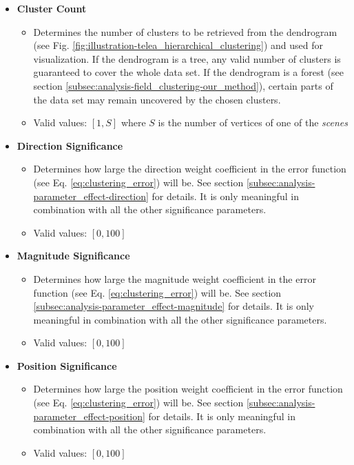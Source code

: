 \begin{itemize}
\item {\bf Cluster Count}
	\begin{itemize}
		\item Determines the number of clusters to be retrieved from the dendrogram (see Fig. \ref{fig:illustration-telea_hierarchical_clustering}) and used for visualization. If the dendrogram is a tree, any valid number of clusters is guaranteed to cover the whole data set. If the dendrogram is a forest (see section \ref{subsec:analysis-field_clustering-our_method}), certain parts of the data set may remain uncovered by the chosen clusters.
		\item Valid values: \([1,S]\) where \(S\) is the number of vertices of one of the {\it scenes}
	\end{itemize}

\item {\bf Direction Significance} 
	\begin{itemize}
		\item Determines how large the direction weight coefficient in the error function (see Eq. \ref{eq:clustering_error}) will be. See section \ref{subsec:analysis-parameter_effect-direction} for details. It is only meaningful in combination with all the other significance parameters\footnotemark.
		\item Valid values: \([0,100]\)
	\end{itemize}

\item {\bf Magnitude Significance}
	\begin{itemize}
		\item Determines how large the magnitude weight coefficient in the error function (see Eq. \ref{eq:clustering_error}) will be. See section \ref{subsec:analysis-parameter_effect-magnitude} for details. It is only meaningful in combination with all the other significance parameters\footnotemark.
		\item Valid values: \([0,100]\)
	\end{itemize}

\item {\bf Position Significance} 
	\begin{itemize}
		\item Determines how large the position weight coefficient in the error function (see Eq. \ref{eq:clustering_error}) will be. See section \ref{subsec:analysis-parameter_effect-position} for details. It is only meaningful in combination with all the other significance parameters\footnotemark.
		\item Valid values: \([0,100]\)
	\end{itemize}
 


\end{itemize}
